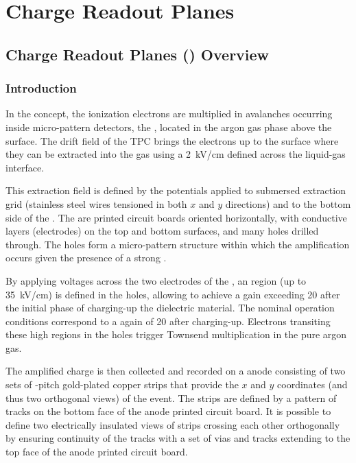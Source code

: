 \chapter{Charge Readout Planes}
\label{ch:fddp-CRP}

\section{Charge Readout Planes () Overview}
\label{sec:fddp-crp-ov}


\subsection{Introduction}
\label{sec:fddp-crp-intro}

In the \dual \lartpc concept, the ionization electrons are multiplied in avalanches  occurring inside micro-pattern detectors, the , located in the argon gas phase above the \lar %
surface. The drift field of the TPC brings the electrons up to the \lar surface where they can  be    extracted into the gas using a 
\SI{2}{kV/cm} \efield defined across the liquid-gas interface.

This extraction field is defined by the potentials applied to submersed extraction grid (stainless steel wires tensioned in both $x$ and $y$ directions) and to the bottom side of the . The  are printed circuit boards oriented horizontally, with conductive layers (electrodes) on the top and bottom surfaces, and many holes drilled through.  The holes form a micro-pattern structure within which the amplification occurs given the presence of a strong \efield.

By applying voltages across the two electrodes of the , an \efield region (up to \SI{35}{kV/cm}) is defined in the holes, allowing to achieve a gain exceeding \num{20} after the initial phase of  charging-up the  dielectric material. The nominal operation conditions correspond to a again of \num{20} after charging-up. Electrons transiting these high \efield regions in the holes trigger Townsend multiplication in the pure argon gas.

The amplified charge is then collected and recorded on a \twod anode consisting of two sets of \dpstrippitch-pitch gold-plated copper strips that provide the $x$ and $y$ coordinates (and thus two orthogonal views) of the event. The strips are defined by a pattern of tracks on the bottom face of the anode printed circuit board. It is possible  to define two electrically insulated views of strips crossing each other orthogonally by ensuring continuity of the tracks with a set of vias and tracks extending to the top face of the anode printed circuit board.

